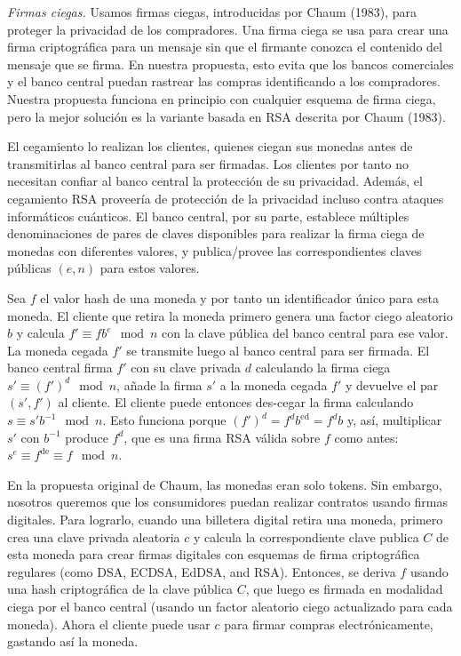 \documentclass[10pt,spanish]{article}
\begin{document}
\emph{Firmas ciegas.} Usamos firmas ciegas, introducidas por Chaum
(1983), para proteger la privacidad de los compradores. Una firma ciega
se usa para crear una firma criptográfica para un mensaje sin que el
firmante conozca el contenido del mensaje que se firma. En nuestra
propuesta, esto evita que los bancos comerciales y el banco central
puedan rastrear las compras identificando a los compradores. Nuestra
propuesta funciona en principio con cualquier esquema de firma ciega,
pero la mejor solución es la variante basada en RSA descrita por Chaum
(1983).

El cegamiento lo realizan los clientes, quienes ciegan sus monedas antes
de transmitirlas al banco central para ser firmadas. Los clientes por
tanto no necesitan confiar al banco central la protección de su
privacidad. Además, el cegamiento RSA proveería de protección de la
privacidad incluso contra ataques informáticos cuánticos. El banco
central, por su parte, establece múltiples denominaciones de pares de
claves disponibles para realizar la firma ciega de monedas con
diferentes valores, y publica/provee las correspondientes claves
públicas $(e, n)$ para estos valores.

Sea $f$ el valor hash de una moneda y por tanto un identificador único
para esta moneda. El cliente que retira la moneda primero genera una
factor ciego aleatorio $b$ y calcula
$f' \equiv fb^{e} \mod n$
con la clave pública del banco central para ese valor.
La moneda cegada $f'$ se transmite luego
al banco central para ser firmada. El banco central firma $f'$ con su
clave privada $d$ calculando la firma ciega
$s' \equiv \left(f' \right)^{d} \mod n$,
añade la firma $s'$ a la moneda cegada $f'$ y devuelve el par
$(s',f')$ al cliente.
El cliente puede entonces des-cegar la firma calculando
$s \equiv s'b^{- 1} \mod n$.
Esto funciona porque
$\left( f' \right)^{d} = f^{d}b^{\text{ed}} = f^{d}b$ y, así,
multiplicar $s'$ con $b^{- 1}$ produce $f^{d}$, que es una firma RSA
válida sobre $f$ como antes:
$s^{e} \equiv f^{\text{de}} \equiv f \mod n$.

En la propuesta original de Chaum, las monedas eran solo tokens. Sin
embargo, nosotros queremos que los consumidores puedan realizar
contratos usando firmas digitales. Para lograrlo, cuando una billetera
digital retira una moneda, primero crea una clave privada aleatoria
$c$ y calcula la correspondiente clave publica $C$ de esta moneda
para crear firmas digitales con esquemas de firma criptográfica
regulares (como DSA, ECDSA, EdDSA, and RSA). Entonces, se deriva $f$
usando una hash criptográfica de la clave pública $C$, que luego es
firmada en modalidad ciega por el banco central (usando un factor
aleatorio ciego actualizado para cada moneda). Ahora el cliente puede
usar $c$ para firmar compras electrónicamente, gastando así la moneda.
\end{document}
